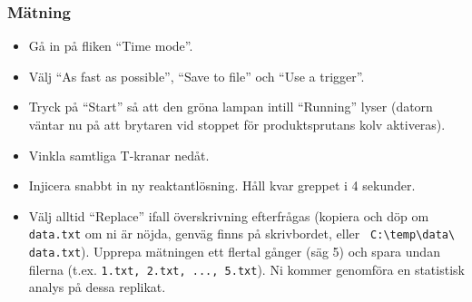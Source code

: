 \subsubsection{Mätning}
\begin{itemize}
\item Gå in på fliken ``Time mode''.
\item Välj ``As fast as possible'', ``Save to file'' och ``Use a trigger''.
\item Tryck på ``Start'' så att den gröna lampan intill ``Running'' lyser
  (datorn väntar nu på att brytaren vid stoppet för produktsprutans kolv aktiveras).
\item Vinkla samtliga T-kranar nedåt.
\item Injicera snabbt in ny reaktantlösning. Håll kvar greppet i 4 sekunder.
\item Välj alltid ``Replace'' ifall överskrivning efterfrågas (kopiera
  och döp om {\tt data.txt} om ni är nöjda, genväg finns på skrivbordet, eller {\tt
    C:\textbackslash temp\textbackslash data\textbackslash
    data.txt}). Upprepa mätningen ett flertal gånger (säg 5) och spara
  undan filerna (t.ex. {\tt 1.txt, 2.txt, ..., 5.txt}). Ni kommer
  genomföra en statistisk analys på dessa replikat.
\end{itemize}


